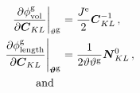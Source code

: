 \documentclass[10pt,letterpaper,oneside]{report}
\newcommand{\ten}[1]{\mbox{\boldmath $#1$}{}}
\newcommand{\tenf}[1]{\mbox{{\sffamily{\bfseries {#1}}}}}
\newcommand{\scas}[1]{\mbox{{\scriptsize{${\rm{#1}}$}}}{}}
\newcommand{\tens}[1]{\mbox{\boldmath{\scriptsize{$#1$}}}{}}
\begin{document}
\begin{align}
\left. \frac{ \partial \phi^{\scas{g}}_{\scas{vol}} }{ \partial \ten{C}_{KL} } \right|_{\vartheta^{\scas{g}}} ={}&\frac{J^{\scas{e}}}{2} \ten{C}^{-1}_{KL} \, ,
\\
\left. \frac{ \partial \phi^{\scas{g}}_{\scas{length}} }{ \partial \ten{C}_{KL} } \right|_{\tens{\vartheta}^{\scas{g}}}  
={}& \frac{1}{2 \vartheta \vartheta^{\scas{g}}} \ten{N}^0_{KL} \, , 
\\ \mbox{and} \qquad

\end{align}
\end{document}
